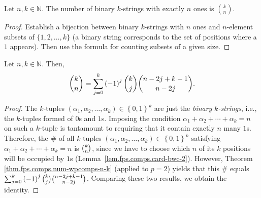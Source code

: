 \begin{lemma}
\label{lem.fps.comps.card-bwc-2}
\leanhelper
\leanok
Let $n,k\in\mathbb{N}$. The number of binary $k$-strings with exactly $n$
ones is $\binom{k}{n}$.
\end{lemma}

\begin{proof}
Establish a bijection between binary $k$-strings with $n$ ones and $n$-element
subsets of $\{1, 2, \ldots, k\}$ (a binary string corresponds to the set of positions
where a $1$ appears). Then use the formula for counting subsets of a given size.
\end{proof}

\begin{proposition}
\label{prop.fps.comps.num-w2comps-n-k-id}
\leantarget
\leanok
Let $n,k\in\mathbb{N}$. Then,%
\[
\dbinom{k}{n}=\sum_{j=0}^{k}\left(  -1\right)  ^{j}\dbinom{k}{j}%
\dbinom{n-2j+k-1}{n-2j}.
\]
\end{proposition}

\begin{proof}
The $k$-tuples $\left(  \alpha_{1},\alpha
_{2},\ldots,\alpha_{k}\right)  \in\left\{  0,1\right\}  ^{k}$ are just the
\emph{binary }$k$\emph{-strings}, i.e., the
$k$-tuples formed of $0$s and $1$s. Imposing the condition $\alpha_{1}%
+\alpha_{2}+\cdots+\alpha_{k}=n$ on such a $k$-tuple is tantamount to
requiring that it contain exactly $n$ many $1$s. Therefore, the \# of all
$k$-tuples $\left(  \alpha_{1},\alpha_{2},\ldots,\alpha_{k}\right)
\in\left\{  0,1\right\}  ^{k}$ satisfying $\alpha_{1}+\alpha_{2}+\cdots
+\alpha_{k}=n$ is $\dbinom{k}{n}$, since we have to choose which $n$ of its
$k$ positions will be occupied by $1$s
(Lemma~\ref{lem.fps.comps.card-bwc-2}).
However, Theorem
\ref{thm.fps.comps.num-wpcomps-n-k} (applied to $p=2$) yields that this \#
equals $\sum_{j=0}^{k}\left(  -1\right)  ^{j}\dbinom{k}{j}\dbinom
{n-2j+k-1}{n-2j}$. Comparing these two results, we obtain the identity.
\end{proof}

